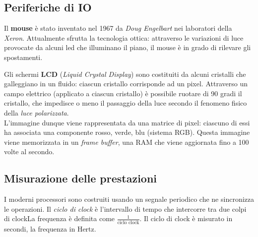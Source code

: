 \subsection{Periferiche di IO}
Il \textbf{mouse} è stato inventato nel 1967 da \textit{Doug Engelbart} nei laboratori della \textit{Xeron}. Attualmente sfrutta la tecnologia ottica: attraverso le variazioni di luce provocate da alcuni led che illuminano il piano, il mouse è in grado di rilevare gli spostamenti.

Gli schermi \textbf{LCD} (\textit{Liquid Crystal Display}) sono costituiti da alcuni cristalli che galleggiano in un fluido: ciascun cristallo corrisponde ad un pixel. Attraverso un campo elettrico (applicato a ciascun cristallo) è possibile ruotare di 90 gradi il cristallo, che impedisce o meno il passaggio della luce secondo il fenomeno fisico della \textit{luce polarizzata}.\\
L'immagine dunque viene rappresentata da una matrice di pixel: ciascuno di essi ha associata una componente rosso, verde, blu (sistema RGB). Questa immagine viene memorizzata in un \textit{frame buffer}, una RAM che viene aggiornata  fino a 100 volte al secondo.

\subsection{Misurazione delle prestazioni}
I moderni processori sono costruiti usando un segnale periodico che ne sincronizza le operazioni. Il \textit{ciclo di clock} è l’intervallo di tempo che intercorre tra due colpi di clockLa frequenza è definita come $\frac{1}{\text{ciclo clock}}$. Il ciclo di clock è misurato in secondi, la frequenza in Hertz.\\

